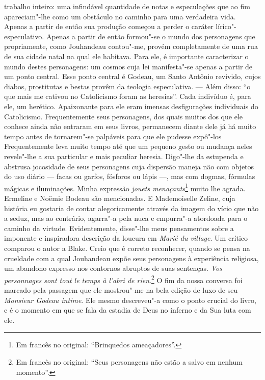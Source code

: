 trabalho inteiro: uma infindável quantidade de notas e especulações que
ao fim apareciam"-lhe como um obstáculo no caminho para uma verdadeira
vida. Apenas a partir de então sua produção começou a perder o caráter
lírico"-especulativo. Apenas a partir de então formou"-se o mundo dos
personagens que propriamente, como Jouhandeau contou"-me, provém
completamente de uma rua de sua cidade natal na qual ele habitava. Para
ele, é importante caracterizar o mundo destes personagens: um cosmos
cuja lei manifesta"-se apenas a partir de um ponto central. Esse ponto
central é Godeau, um Santo Antônio revivido, cujos diabos, prostitutas e
bestas provêm da teologia especulativa. --- Além disso: ``o que mais me
cativou no Catolicismo foram as heresias''. Cada indivíduo é, para ele,
um herético. Apaixonante para ele eram imensas desfigurações individuais
do Catolicismo. Frequentemente seus personagens, dos quais muitos dos
que ele conhece ainda não entraram em seus livros, permanecem diante
dele já há muito tempo antes de tornarem"-se palpáveis para que ele
pudesse expô"-los Frequentemente leva muito tempo até que um pequeno
gesto ou mudança neles revele"-lhe a sua particular e mais peculiar
heresia. Digo"-lhe da estupenda e abstrusa jocosidade de seus personagens
cuja dispersão maneja não com objetos do uso diário --- facas ou garfos,
fósforos ou lápis ---, mas com dogmas, fórmulas mágicas e iluminações.
Minha expressão \emph{jouets menaçants}\footnote{Em francês no original: ``Brinquedos
  ameaçadores''. \versal{[N. T.]}} muito lhe agrada. Ermeline e
Noëmie Bodeau são mencionadas. E Mademoiselle Zeline, cuja história eu
gostaria de contar alegoricamente através da imagem do vício que não a
seduz, mas ao contrário, agarra"-a pela nuca e empurra"-a atordoada para o
caminho da virtude. Evidentemente, disse"-lhe meus pensamentos sobre a
imponente e inspiradora descrição da loucura em \emph{Marié du village}.
Um crítico comparou o autor a Blake. Creio que é correto reconhecer,
quando se pensa na crueldade com a qual Jouhandeau expõe seus
personagens à experiência religiosa, um abandono expresso nos contornos
abruptos de suas sentenças. \emph{Vos personnages sont tout le temps à
l'abri de rien}.\footnote{Em francês no original: ``Seus personagens não estão a salvo em
  nenhum momento''. \versal{[N. T.]}} O fim da nossa conversa
foi marcado pela passagem que ele mostrou"-me na bela edição de luxo de
seu \emph{Monsieur Godeau intime}. Ele mesmo descreveu"-a como o ponto
crucial do livro, e é o momento em que se fala da estadia de Deus no
inferno e da Sua luta com ele.

